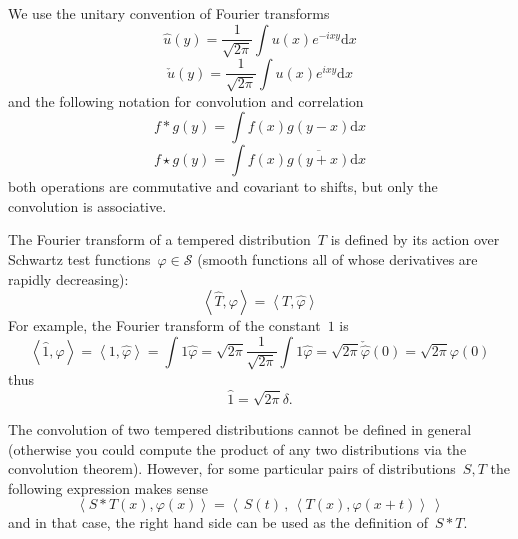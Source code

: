 \documentclass[a4paper]{article}      %
\newcommand{\1}{\mathbf{1}}
\newcommand{\ud}{\mathrm{d}}
\newcommand{\pairing}[2]{\left\langle #1,#2\right\rangle}
\begin{document}
We use the unitary convention of Fourier transforms
$$ \hat{u}(y)=\frac{1}{\sqrt{2\pi}}\int u(x)e^{-ixy}\ud x $$
$$ \check{u}(y)=\frac{1}{\sqrt{2\pi}}\int u(x)e^{ixy}\ud x $$
and the following notation for convolution and correlation
$$ f*g(y)=\int f(x)g(y-x)\ud x $$
$$ f\star g(y)=\int f(x)\overline{g(y+x)}\ud x $$
both operations are commutative and covariant to shifts, but only the
convolution is associative.


The Fourier transform of a tempered distribution~$T$ is defined by its action
over Schwartz test functions~$\varphi\in\mathcal{S}$ (smooth functions
all of whose derivatives are rapidly decreasing):
$$
\pairing{\hat{T}}\varphi
=
\pairing{T}{\hat{\varphi}}
$$
For example, the Fourier transform of the constant~$1$ is
$$
\pairing{\hat 1}{\varphi}
=
\pairing{1}{\hat \varphi}
=
\int 1\hat\varphi
=
\sqrt{2\pi}\frac{1}{\sqrt{2\pi}}\int 1\hat\varphi
=\sqrt{2\pi}\check{\hat{\varphi}}(0)
=\sqrt{2\pi}\varphi(0)
$$
thus
\begin{equation}
	\hat 1=\sqrt{2\pi}\delta.
	\label{eq:dirac}
\end{equation}

The convolution of two tempered distributions cannot be defined in general
(otherwise you could compute the product of any two distributions via the
convolution theorem).  However, for some particular pairs of
distributions~$S,T$ the following expression makes sense
$$
\pairing{S*T(x)}{\varphi(x)}
=
\pairing{\,S(t)\,}{\,\pairing{T(x)}{\varphi(x+t)}\,}
$$
and in that case, the right hand side can be used as the definition of~$S*T$.
\end{document}
